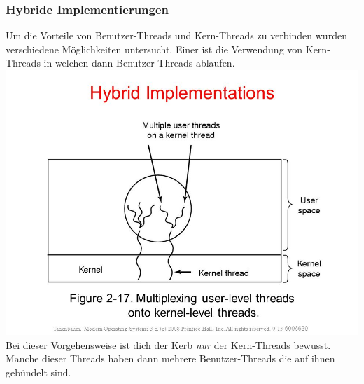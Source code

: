 \documentclass[12pt,a4paper]{univention}
\begin{document}
\subsubsection{Hybride Implementierungen}
Um die Vorteile von Benutzer-Threads und Kern-Threads zu verbinden wurden verschiedene Möglichkeiten untersucht. Einer ist die Verwendung von Kern-Threads in welchen dann Benutzer-Threads ablaufen. \\
\includegraphics[scale=0.5]{hybridthreads.jpg}\\
Bei dieser Vorgehensweise ist dich der Kerb \textit{nur} der Kern-Threads bewusst. Manche dieser Threads haben dann mehrere Benutzer-Threads die auf ihnen gebündelt sind.
\end{document}
